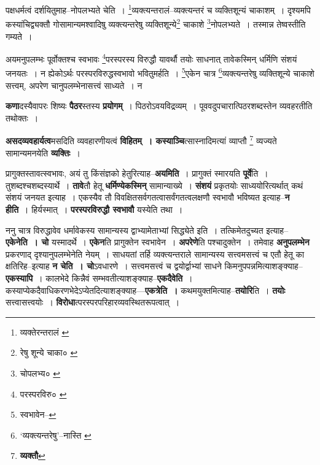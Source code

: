 \documentclass[article,12pt,a4paper]{memoir}
\begin{document}
	  \pstart पक्षधर्मत्वं दर्शयितुमाह--नोपलभ्यते चेति । \footnote{व्यक्तेरन्तरालं \cite{dp-msA} \cite{dp-msB} \cite{dp-edP} \cite{dp-edH}}व्यक्त्यन्तरालं--व्यक्त्यन्तरं च व्यक्तिशून्यं चाकाशम् । दृश्यमपि कस्यांचिद्व्यक्तौ गोसामान्यमश्वादिषु व्यक्त्यन्तरेषु व्यक्तिशून्ये\footnote{रेषु शून्ये चाका० \cite{dp-msA}} चाकाशे \footnote{चोपलभ्य० \cite{dp-msA} \cite{dp-msB} \cite{dp-edP} \cite{dp-edH}}नोपलभ्यते । तस्मान्न तेष्वस्तीति गम्यते ।
	\pend
       

	  \pstart अयमनुपलम्भः पूर्वोक्तश्च स्वभावः \footnote{परस्परविरु० \cite{dp-msA} \cite{dp-msB} \cite{dp-msC} \cite{dp-edP} \cite{dp-edH} \cite{dp-edE} \cite{dp-edN}}परस्परस्य विरुद्धौ यावर्थौ तयोः साधनात् तावेकस्मिन् धर्मिणि संशयं जनयतः । न ह्येकोऽर्थः परस्परविरुद्धस्वभावो भवितुमर्हति । \footnote{स्वभावेन--\cite{dp-msD-n}}एकेन चात्र \footnote{‘व्यक्त्यन्तरेषु’--नास्ति \cite{dp-msB}}व्यक्त्यन्तरेषु व्यक्तिशून्ये चाकाशे सत्त्वम्, अपरेण चानुपलम्भेनासत्त्वं साध्यते । न
	\pend
      

	  \pstart \textbf{कणा}दस्यैवापरः शिष्यः \textbf{पैठर}स्तस्य \textbf{प्रयोगम्} । पिठरोऽवयविद्रव्यम् । पूववदुपचारात्पिठरशब्दस्तेन व्यवहरतीति तथोक्तः ।
	\pend
      

	  \pstart \textbf{असदव्यवहार्यत्व}मसदिति व्यवहारणीयत्वं \textbf{विहितम् । कस्याञ्चि}त्सास्नादिमत्यां व्याप्तौ \footnote{\textbf{व्यक्तौ}} व्यज्यते सामान्यमनयेति \textbf{व्यक्तिः} ।
	\pend
      

	  \pstart प्रागुक्तस्तावत्स्वभावः, अयं तु किंसंज्ञको हेतुरित्याह--\textbf{अयमिति} । प्रागुक्तं स्मारयति \textbf{पूर्वे}ति । तुशब्दश्चशब्दस्यार्थे । \textbf{तावे}तौ हेतू \textbf{धर्मिण्येकस्मिन्} सामान्याख्ये । \textbf{संशयं} प्रकृतयोः साध्ययोरित्यर्थात् कथं संशयं जनयत इत्याह । एकस्यैव तौ विवक्षितसर्वगतत्वासर्वंगतत्वलक्षणौ स्वभावौ भविष्यत इत्याह--\textbf{न हीति} । हिर्यस्मात् । \textbf{परस्परविरुद्धौ स्वभावौ} यस्येति तथा ।
	\pend
      

	  \pstart ननु चात्र विरुद्धावेव धर्मावेकस्य सामान्यस्य द्वाभ्यामेताभ्यां सिद्ध्येते इति । तत्किमेतदुच्यत इत्याह--\textbf{एकेनेति । चो} यस्मादर्थे । \textbf{एकेन}ति प्रागुक्तेन स्वभावेन । \textbf{अपरेणे}ति पश्चादुक्तेन । तमेवाह \textbf{अनुपलम्भेन} प्रकरणाद् दृश्यानुपलम्भेनेति नेयम् । साधयतां तर्हि व्यक्त्यन्तराले सामान्यस्य सत्त्वमसत्त्वं च एतौ हेतू का क्षतिरिह--इत्याह \textbf{न चेति । चो}ऽवधारणे । सत्त्वमसत्त्वं च द्वयोर्द्वाभ्यां साधने किमनुपपन्नमित्याशङ्क्याह--\textbf{एकस्यापि} । कालभेदे किन्नैवं सम्भवतीत्याशङ्क्याह--\textbf{एकदैवेति} । कस्याप्येकदैवाधिकरणभेदेऽप्येतदित्याशङ्क्याह—\textbf{एकत्रेति ।} कथमयुक्तमित्याह--\textbf{तयोरि}ति । \textbf{तयोः} सत्त्वासत्त्वयोः । \textbf{विरोधा}त्परस्परपरिहारव्यवस्थितरूपत्वात् ।
	\pend
      
\end{document}
